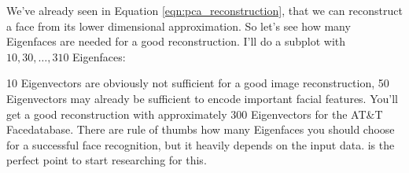 We've already seen in Equation \ref{eqn:pca_reconstruction}, that we can reconstruct a face from its lower dimensional approximation. So let's see how many Eigenfaces are needed for a good reconstruction. I'll do a subplot with $10,30,\ldots,310$ Eigenfaces:

\ifx\python\undefined
	
\else
	
\fi

10 Eigenvectors are obviously not sufficient for a good image reconstruction, 50 Eigenvectors may already be sufficient to encode important facial features. You'll get a good reconstruction with approximately 300 Eigenvectors for the AT\&T Facedatabase. There are rule of thumbs how many Eigenfaces you should choose for a successful face recognition, but it heavily depends on the input data. \cite{zhao2003frl} is the perfect point to start researching for this.

